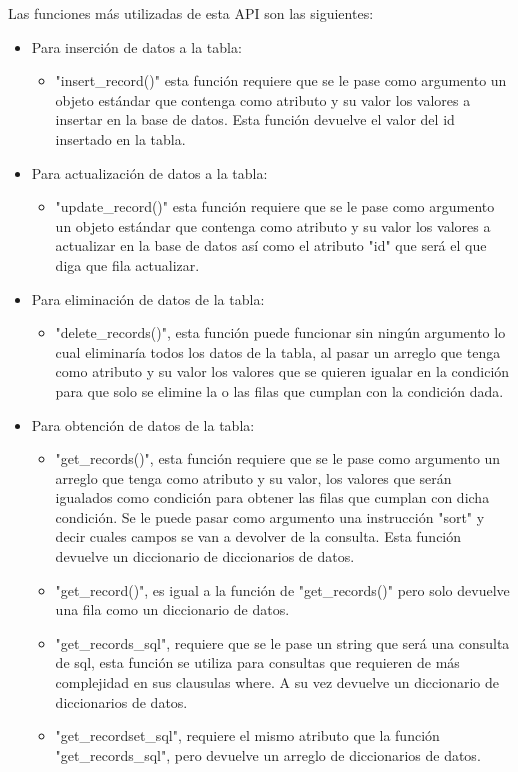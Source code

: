     Las funciones más utilizadas de esta API son las siguientes:

    \begin{itemize}
      \item Para inserción de datos a la tabla:

\begin{itemize}
  \item "insert\_record()" esta función requiere que se le pase como argumento un objeto estándar que contenga como atributo y su valor los valores a insertar en la base de datos. Esta función devuelve el valor del id insertado en la tabla.
\end{itemize}

      \item Para actualización de datos a la tabla:

      \begin{itemize}
        \item 	"update\_record()" esta función requiere que se le pase como argumento un objeto estándar que contenga como atributo y su valor los valores a actualizar en la base de datos así como el atributo "id" que será el que diga que fila actualizar.
      \end{itemize}

      \item Para eliminación de datos de la tabla:

      \begin{itemize}
        \item "delete\_records()", esta función puede funcionar sin ningún argumento lo cual eliminaría todos los datos de la tabla, al pasar un arreglo que tenga como atributo y su valor los valores que se quieren igualar en la condición para que solo se elimine la o las filas que cumplan con la condición dada.
      \end{itemize}

      \item Para obtención de datos de la tabla:

      \begin{itemize}
        \item "get\_records()", esta función requiere que se le pase como argumento un arreglo que tenga como atributo y su valor, los valores que serán igualados como condición para obtener las filas que cumplan con dicha condición. Se le puede pasar como argumento una instrucción "sort" y decir cuales campos se van a devolver de la consulta. Esta función devuelve un diccionario de diccionarios de datos.
        \item "get\_record()", es igual a la función de "get\_records()" pero solo devuelve una fila como un diccionario de datos.
        \item "get\_records\_sql", requiere que se le pase un string que será una consulta de sql, esta función se utiliza para consultas que requieren de más complejidad en sus clausulas where. A su vez devuelve un diccionario de diccionarios de datos.
        \item "get\_recordset\_sql", requiere el mismo atributo que la función "get\_records\_sql", pero devuelve un arreglo de diccionarios de datos.
      \end{itemize}


\end{itemize}
